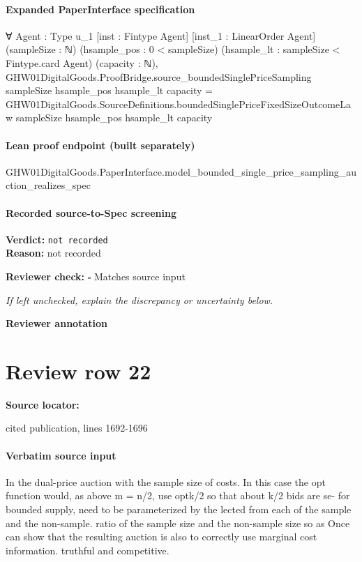 \documentclass[10pt]{article}
\newcommand{\reviewerbox}{%
  \par\noindent\fbox{\parbox{0.96\linewidth}{\rule{0pt}{0.38in}}}\par
}
\newcommand{\reviewmatch}[1]{%
  \par\noindent\textbf{Reviewer check:} $\square$\; #1\par
  \noindent\emph{If left unchecked, explain the discrepancy or uncertainty below.}\par
}
\begin{document}
\paragraph{Expanded PaperInterface specification}
\begin{ReviewVerbatim}
∀ {Agent : Type u_1} [inst : Fintype Agent] [inst_1 : LinearOrder Agent] (sampleSize : ℕ) (hsample_pos : 0 < sampleSize)
  (hsample_lt : sampleSize < Fintype.card Agent) (capacity : ℕ),
  GHW01DigitalGoods.ProofBridge.source_boundedSinglePriceSampling sampleSize hsample_pos hsample_lt capacity =
    GHW01DigitalGoods.SourceDefinitions.boundedSinglePriceFixedSizeOutcomeLaw sampleSize hsample_pos hsample_lt capacity
\end{ReviewVerbatim}

\paragraph{Lean proof endpoint (built separately)}\begin{ReviewVerbatim}
GHW01DigitalGoods.PaperInterface.model_bounded_single_price_sampling_auction_realizes_spec
\end{ReviewVerbatim}

\paragraph{Recorded source-to-Spec screening}
\textbf{Verdict:} \texttt{not recorded}
\\
\textbf{Reason:} not recorded
\reviewmatch{Matches source input}
\noindent\textbf{Reviewer annotation}\par
\reviewerbox
\clearpage
\hypertarget{source-claim-cea76b79a41765be}{}
\section*{Review row 22}
\textbf{Source locator:} {\footnotesize\raggedright cited publication, lines 1692-\allowbreak{}1696\par}
\paragraph{Verbatim source input}
\begin{ReviewVerbatim}
In the dual-price auction with the sample size of costs. In this case the opt function would, as above
m = n/2, use optk/2 so that about k/2 bids are se- for bounded supply, need to be parameterized by the
lected from each of the sample and the non-sample. ratio of the sample size and the non-sample size so as
Once can show that the resulting auction is also to correctly use marginal cost information.
truthful and competitive.
\end{ReviewVerbatim}
\end{document}
